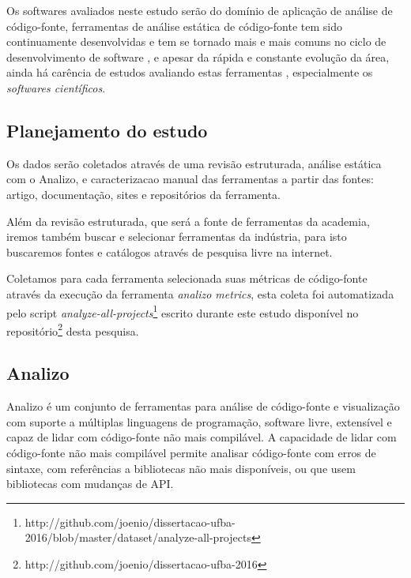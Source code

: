 Os softwares avaliados neste estudo serão do domínio de aplicação de análise de
código-fonte, ferramentas de análise estática de código-fonte tem sido
continuamente desenvolvidas e tem se tornado mais e mais comuns no ciclo de
desenvolvimento de software \cite{Novak2010}, e apesar da rápida e constante
evolução da área, ainda há carência de estudos avaliando estas ferramentas
\cite{Li2010}, especialmente os {\it softwares científicos}.

%
%
%
%
%

\subsection{Planejamento do estudo}

Os dados serão coletados através de uma revisão estruturada, análise estática
com o Analizo, e caracterizacao manual das ferramentas a partir das fontes:
artigo, documentação, sites e repositórios da ferramenta.

Além da revisão estruturada, que será a fonte de ferramentas da academia,
iremos também buscar e selecionar ferramentas da indústria, para isto
buscaremos fontes e catálogos através de pesquisa livre na internet.

Coletamos para cada ferramenta selecionada suas métricas de código-fonte
através da execução da ferramenta {\it analizo metrics}, esta coleta foi
automatizada pelo script {\it
analyze-all-projects}\footnote{http://github.com/joenio/dissertacao-ufba-2016/blob/master/dataset/analyze-all-projects}
escrito durante este estudo disponível no
repositório\footnote{http://github.com/joenio/dissertacao-ufba-2016} desta
pesquisa.

\subsection{Analizo} \label{analizo}

Analizo é um conjunto de ferramentas para análise de código-fonte e
visualização com suporte a múltiplas linguagens de programação, software livre,
extensível e capaz de lidar com código-fonte não mais compilável. A capacidade
de lidar com código-fonte não mais compilável permite analisar código-fonte
com erros de sintaxe, com referências a bibliotecas não mais disponíveis, ou
que usem bibliotecas com mudanças de API.

